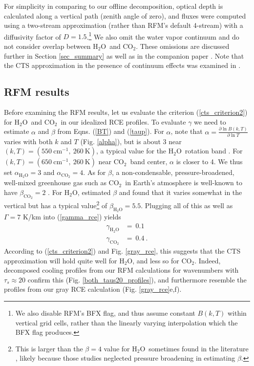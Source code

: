 \documentclass{ametsoc}
\newcommand{\beqn}{\begin{equation}}
\newcommand{\eeqn}{\end{equation}}
\newcommand{\eqnref}[1]{(\ref{#1})}
\newcommand{\Kelvin}{\ensuremath{\mathrm{K}}}
\newcommand{\cminverse}{\ensuremath{\mathrm{cm^{-1}}}}
\newcommand{\partialder}[2]{\ensuremath{\frac{\partial #1}{\partial #2}}}
\newcommand{\cotwo}{\ensuremath{\mathrm{CO_2}}}
\newcommand{\htwo}{\ensuremath{\mathrm{H_2O}}}
\newcommand{\taus}{\ensuremath{\tau_s}}
\begin{document}
 For simplicity in comparing to our offline decomposition, optical depth is calculated along a vertical path (zenith angle of zero), and fluxes   were computed using a two-stream approximation (rather than RFM's default 4-stream) with a diffusivity factor of $D=1.5$.\footnote{We also disable RFM's BFX flag, and thus assume constant $B(k,T)$ within vertical grid cells, rather than the linearly varying interpolation which the BFX flag produces.} We also omit the water vapor continuum and do not consider overlap between \htwo\ and \cotwo. These omissions are discussed further in Section \ref{sec_summary} as well as in the companion paper  \cite{jeevanjee2019a}. Note that the CTS approximation in the presence of continuum effects was examined in \cite{clough1992}.
 

\subsection{RFM results} \label{sec_real_rce}
Before examining the RFM results, let us evaluate the criterion \eqnref{cts_criterion2} for \htwo\ and \cotwo\ in our idealized RCE profiles. To evaluate $\gamma$ we need to estimate $\alpha$ and $\beta$ from Eqns. \eqnref{BT} and \eqnref{taup}. For $\alpha$, note that $\alpha = \partialder{ \ln B(k,T)}{\ln T}$ varies with both $k$ and $T$ (Fig. \ref{alpha}), but is about 3 near $(k,T)=(550\  \cminverse,\ 260\ \Kelvin)$, a typical value for the \htwo\ rotation band \citep[][]{jeevanjee2019a}. For $(k,T)=(650\  \cminverse,\ 260\  \Kelvin)$ near \cotwo\ band center, $\alpha$ is closer to 4.   We thus set $\alpha_{\htwo}=3 $ and $\alpha_{\cotwo}=4$.  As for $\beta$, a non-condensable, pressure-broadened, well-mixed greenhouse gas such as \cotwo\ in Earth's atmosphere is well-known to have $\beta_{\cotwo} = 2$ \citep{pierrehumbert2010}. For \htwo, \cite{jeevanjee2019a} estimated $\beta$ and found that it varies somewhat in the vertical but has a typical value\footnote{This is larger than the $\beta=4$ value for \htwo\ sometimes found in the literature \citep[e.g.][]{frierson2006}, likely because those studies neglected pressure broadening in estimating $\beta$.} of $\beta_{\htwo} = 5.5$. Plugging all of this as well as $\Gamma=7$ K/km into \eqnref{gamma_rce} yields
	\beqn
		\begin{split}
			\gamma_{\htwo}     & =  \  0.1        \\
			\gamma_{\cotwo}   & =  \ 0.4  \ .   		
		\end{split}
	\label{gamma_vals}
	\eeqn
According to \eqnref{cts_criterion2} and Fig. \ref{gray_rce}, this suggests that the CTS approximation will hold quite well for \htwo, and less so for \cotwo. Indeed,  decomposed cooling profiles from our RFM calculations for wavenumbers with $\taus\approx20$  confirm this (Fig. \ref{both_taus20_profiles}), and furthermore resemble the profiles from our gray RCE calculation (Fig. \ref{gray_rce}e,f).
\end{document}
